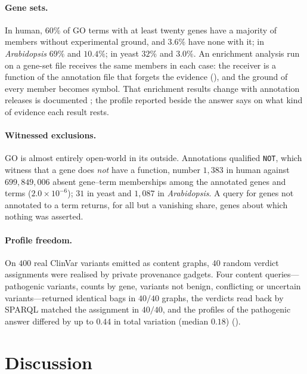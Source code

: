 \documentclass[11pt,twocolumn,a4paper]{article}
\theoremstyle{plain}
\theoremstyle{definition}
\theoremstyle{remark}
\newcommand{\vsym}{\textsf{symbol}}
\begin{document}
\paragraph{Gene sets.} In human, $60\%$ of GO terms with at least twenty genes
have a majority of members without experimental ground, and $3.6\%$ have none
with it; in \emph{Arabidopsis} $69\%$ and $10.4\%$; in yeast $32\%$ and $3.0\%$.
An enrichment analysis run on a gene-set file
\citep{subramanian2005,liberzon2011,khatri2012} receives the same members in
each case: the receiver is a function of the annotation file that forgets the
evidence (), and the ground of every member becomes \vsym.
That enrichment results change with annotation releases is documented
\citep{tomczak2018}; the profile reported beside the answer says on what kind of
evidence each result rests.

\paragraph{Witnessed exclusions.} GO is almost entirely open-world in its
outside. Annotations qualified \texttt{NOT}, which witness that a gene does
\emph{not} have a function, number $1{,}383$ in human against $699{,}849{,}006$
absent gene--term memberships among the annotated genes and terms
($2.0\times10^{-6}$); $31$ in yeast and $1{,}087$ in \emph{Arabidopsis}. A
query for genes not annotated to a term returns, for all but a vanishing share,
genes about which nothing was asserted.

\paragraph{Profile freedom.} On $400$ real ClinVar variants emitted as content
graphs, $40$ random verdict assignments were realised by private provenance
gadgets. Four content queries---pathogenic variants, counts by gene, variants not
benign, conflicting or uncertain variants---returned identical bags in $40/40$
graphs, the verdicts read back by SPARQL matched the assignment in $40/40$, and
the profiles of the pathogenic answer differed by up to $0.44$ in total
variation (median $0.18$) ().

\section{Discussion}
\label{sec:discussion}
\end{document}
